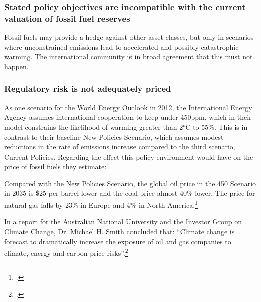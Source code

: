 	\subsubsection {Stated policy objectives are incompatible with the current valuation of fossil fuel reserves}



Fossil fuels may provide a hedge against other asset classes, but only in scenarios where unconstrained emissions lead to accelerated and possibly catastrophic warming. 
The international community is in broad agreement that this must not happen.


	\subsubsection {Regulatory risk is not adequately priced} 



As one scenario for the World Energy Outlook in 2012, the International Energy Agency assumes international cooperation to keep  under 450ppm, which in their model constrains the likelihood of warming greater than 2°C to 55\%. 
This is in contrast to their baseline New Policies Scenario, which assumes modest reductions in the rate of emissions increase compared to the third scenario, Current Policies. 
Regarding the effect this policy environment would have on the price of fossil fuels they estimate:
\begin{slquote}Compared with the New Policies Scenario, the global oil price in the 450 Scenario in 2035 is \$25 per barrel lower and the coal price almost 40\% lower. The price for natural gas falls by 23\% in Europe and 4\% in North America.\footcite[][p. 257]{IEA2012}
\end{slquote}
In a report for the Australian National University and the Investor Group on Climate Change, Dr. Michael H. Smith concluded that: ``Climate change is forecast to dramatically increase the exposure of oil and gas companies to climate, energy and carbon price risks''.\footcite[][p. 14]{RisksForInvestors}



